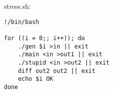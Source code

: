 stress.sh:
\begin{verbatim}
!/bin/bash

for ((i = 0;; i++)); do
	./gen $i >in || exit
	./main <in >out1 || exit
	./stupid <in >out2 || exit
	diff out2 out2 || exit
	echo $i OK
done
\end{verbatim}
